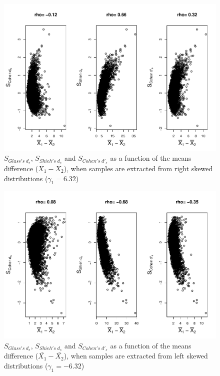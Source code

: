 \documentclass[
  man]{apa6}
\begin{document}
\begin{figure}
\centering
\includegraphics{Correlations-between-the-sample-means-difference-and-standardizers-of-all-estimators,-and-implications-on-biases-and-variances-of-all-estimators_files/figure-latex/StdzrC2Rs-1.pdf}
\caption{\label{fig:StdzrC2Rs}\(S_{Glass's \; d_s}\), \(S_{Shieh's \; d_s}\) and \(S_{Cohen's \; d'_s}\) as a function of the means difference (\(\bar{X_1}-\bar{X_2}\)), when samples are extracted from right skewed distributions (\(\gamma_1 = 6.32\))}
\end{figure}

\begin{figure}
\centering
\includegraphics{Correlations-between-the-sample-means-difference-and-standardizers-of-all-estimators,-and-implications-on-biases-and-variances-of-all-estimators_files/figure-latex/StdzrC2Ls-1.pdf}
\caption{\label{fig:StdzrC2Ls}\(S_{Glass's \; d_s}\), \(S_{Shieh's \; d_s}\) and \(S_{Cohen's \; d'_s}\) as a function of the means difference (\(\bar{X_1}-\bar{X_2}\)), when samples are extracted from left skewed distributions (\(\gamma_1 = -6.32\))}
\end{figure}
\end{document}
